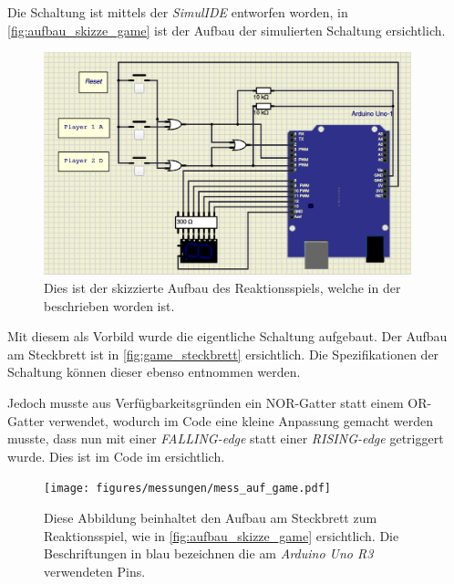 \documentclass[12pt,english,ngerman]{scrartcl}
\begin{document}
Die Schaltung ist mittels der \textit{SimulIDE} entworfen worden, in \autoref{fig:aufbau_skizze_game} 
ist der Aufbau der simulierten Schaltung ersichtlich. 
\begin{figure}[H]
  \centering
 \includegraphics[width=0.95\textwidth]{./figures/messungen/aufbau_game.png}
  \caption{Dies ist der skizzierte Aufbau des Reaktionsspiels, welche in der  beschrieben worden ist.}
  \label{fig:aufbau_skizze_game}
\end{figure}

Mit diesem als Vorbild wurde die eigentliche Schaltung aufgebaut.
Der Aufbau am Steckbrett ist in \autoref{fig:game_steckbrett} ersichtlich.
Die Spezifikationen der Schaltung können dieser ebenso entnommen werden.


Jedoch musste aus Verfügbarkeitsgründen ein NOR-Gatter statt einem OR-Gatter verwendet, 
wodurch im Code eine kleine Anpassung gemacht werden musste, dass nun mit 
einer \textit{FALLING-edge} statt einer \textit{RISING-edge} getriggert wurde. 
Dies ist im Code im  
ersichtlich.

\begin{figure}[H]
  \begin{center}
  \texttt{[image: figures/messungen/mess\_auf\_game.pdf]}
  \end{center}
  \caption{Diese Abbildung beinhaltet den Aufbau am Steckbrett zum Reaktionsspiel, wie in \autoref{fig:aufbau_skizze_game} ersichtlich.
  Die Beschriftungen in blau bezeichnen die am \textit{Arduino Uno R3} verwendeten
  Pins.}
  \label{fig:game_steckbrett}
\end{figure}
\end{document}
